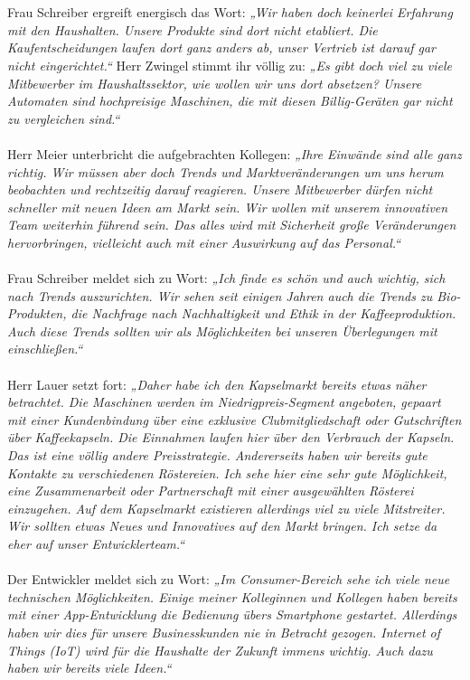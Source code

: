 {\\~\\
Frau Schreiber ergreift energisch das Wort: \textit{„Wir haben doch keinerlei Erfahrung mit den Haushalten. Unsere Produkte sind dort nicht etabliert. Die Kaufentscheidungen laufen dort ganz anders ab, unser Vertrieb ist darauf gar nicht eingerichtet.“} Herr Zwingel stimmt ihr völlig zu: \textit{„Es gibt doch viel zu viele Mitbewerber im Haushaltssektor, wie wollen wir uns dort absetzen? Unsere Automaten sind hochpreisige Maschinen, die mit diesen Billig-Geräten gar nicht zu vergleichen sind.“}
\\~\\
Herr Meier unterbricht die aufgebrachten Kollegen: \textit{„Ihre Einwände sind alle ganz richtig. Wir müssen aber doch Trends und Marktveränderungen um uns herum beobachten und rechtzeitig darauf reagieren. Unsere Mitbewerber dürfen nicht schneller mit neuen Ideen am Markt sein. Wir wollen mit unserem innovativen Team weiterhin führend sein. Das alles wird mit Sicherheit große Veränderungen hervorbringen, vielleicht auch mit einer Auswirkung auf das Personal.“}
\\~\\
Frau Schreiber meldet sich zu Wort: \textit{„Ich finde es schön und auch wichtig, sich nach Trends auszurichten. Wir sehen seit einigen Jahren auch die Trends zu Bio-Produkten, die Nachfrage nach Nachhaltigkeit und Ethik in der Kaffeeproduktion. Auch diese Trends sollten wir als Möglichkeiten bei unseren Überlegungen mit einschließen.“}
\\~\\
Herr Lauer setzt fort: \textit{„Daher habe ich den Kapselmarkt bereits etwas näher betrachtet. Die Maschinen werden im Niedrigpreis-Segment angeboten, gepaart mit einer Kundenbindung über eine exklusive Clubmitgliedschaft oder Gutschriften über Kaffeekapseln. Die Einnahmen laufen hier über den Verbrauch der Kapseln. Das ist eine völlig andere Preisstrategie. Andererseits haben wir bereits gute Kontakte zu verschiedenen Röstereien. Ich sehe hier eine sehr gute Möglichkeit, eine Zusammenarbeit oder Partnerschaft mit einer ausgewählten Rösterei einzugehen. Auf dem Kapselmarkt existieren allerdings viel zu viele Mitstreiter. Wir sollten etwas Neues und Innovatives auf den Markt bringen. Ich setze da eher auf unser Entwicklerteam.“}
\\~\\
Der Entwickler meldet sich zu Wort: \textit{„Im Consumer-Bereich sehe ich viele neue technischen Möglichkeiten. Einige meiner Kolleginnen und Kollegen haben bereits mit einer App-Entwicklung die Bedienung übers Smartphone gestartet. Allerdings haben wir dies für unsere Businesskunden nie in Betracht gezogen. Internet of Things (IoT) wird für die Haushalte der Zukunft immens wichtig. Auch dazu haben wir bereits viele Ideen.“}
}
